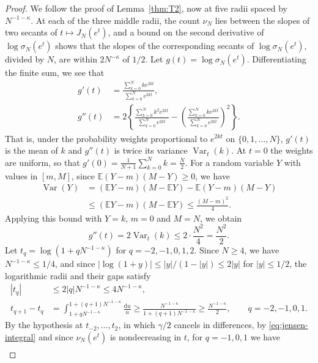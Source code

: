 \begin{proof}
We follow the proof of Lemma~\ref{thm:T2}, now at five radii spaced by
$N^{-1-\kappa}$. At each of the three middle radii, the count $\nu_N$ lies
between the slopes of two secants of $t\mapsto J_N(e^t)$, and a bound on
the second derivative of $\log\sigma_N(e^t)$ shows that the slopes of the
corresponding secants of $\log\sigma_N(e^t)$, divided by $N$, are within
$2N^{-\kappa}$ of $1/2$.
Let $g(t)=\log\sigma_N(e^t)$.
Differentiating the finite sum, we see that
\begin{align*}
 g'(t)&=\frac{\sum_{k=0}^Nke^{2kt}}{\sum_{k=0}^Ne^{2kt}},\\
 g''(t)&=2\left\{
 \frac{\sum_{k=0}^Nk^2e^{2kt}}{\sum_{k=0}^Ne^{2kt}}
 -\left(\frac{\sum_{k=0}^Nke^{2kt}}{\sum_{k=0}^Ne^{2kt}}\right)^2
 \right\}.
\end{align*}
That is, under the probability weights proportional to $e^{2kt}$ on
$\{0,1,\dots,N\}$, $g'(t)$ is the mean of $k$ and $g''(t)$ is twice its
variance $\operatorname{Var}_t(k)$. At $t=0$ the weights are uniform, so
that $g'(0)=\frac1{N+1}\sum_{k=0}^Nk=\frac N2$.
For a random variable $Y$ with values in $[m,M]$, since
$\mathbb E(Y-m)(M-Y)\ge0$, we have
\begin{align*}
 \operatorname{Var}(Y)
 &=(\mathbb EY-m)(M-\mathbb EY)-\mathbb E(Y-m)(M-Y)\\
 &\le(\mathbb EY-m)(M-\mathbb EY)
 \le\frac{(M-m)^2}{4}.
\end{align*}
Applying this bound with $Y=k$, $m=0$ and $M=N$, we obtain
\begin{equation}
 g''(t)=2\operatorname{Var}_t(k)\le2\cdot\frac{N^2}4=\frac{N^2}2.
                                                        \label{eq:layer2-gpp}
\end{equation}
Let $t_q=\log(1+qN^{-1-\kappa})$ for $q=-2,-1,0,1,2$.
Since $N\ge4$, we have $N^{-1-\kappa}\le1/4$, and since
$|\log(1+y)|\le|y|/(1-|y|)\le2|y|$ for $|y|\le1/2$, the logarithmic radii
and their gaps satisfy
\begin{align*}
 |t_q|&\le2|q|N^{-1-\kappa}\le4N^{-1-\kappa},\\
 t_{q+1}-t_q
 &=\int_{1+qN^{-1-\kappa}}^{1+(q+1)N^{-1-\kappa}}\frac{\mathrm du}{u}
 \ge\frac{N^{-1-\kappa}}{1+(q+1)N^{-1-\kappa}}
 \ge\frac{N^{-1-\kappa}}2,\qquad q=-2,-1,0,1.
\end{align*}
By the hypothesis at $t_{-2},\dots,t_2$, in which $\gamma/2$ cancels in
differences, by \eqref{eq:jensen-integral} and since $\nu_N(e^t)$ is
nondecreasing in $t$, for $q=-1,0,1$ we have
\begin{align*}

\end{align*}
\end{proof}

